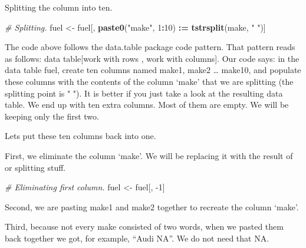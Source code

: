 \documentclass[]{book}
\newenvironment{Shaded}{\begin{snugshade}}{\end{snugshade}}
\newcommand{\CommentTok}[1]{\textcolor[rgb]{0.56,0.35,0.01}{\textit{#1}}}
\newcommand{\DecValTok}[1]{\textcolor[rgb]{0.00,0.00,0.81}{#1}}
\newcommand{\ErrorTok}[1]{\textcolor[rgb]{0.64,0.00,0.00}{\textbf{#1}}}
\newcommand{\KeywordTok}[1]{\textcolor[rgb]{0.13,0.29,0.53}{\textbf{#1}}}
\newcommand{\NormalTok}[1]{#1}
\newcommand{\OperatorTok}[1]{\textcolor[rgb]{0.81,0.36,0.00}{\textbf{#1}}}
\newcommand{\StringTok}[1]{\textcolor[rgb]{0.31,0.60,0.02}{#1}}
\begin{document}
Splitting the column into ten.

\begin{Shaded}
\begin{Highlighting}[]
\CommentTok{# Splitting.}
\NormalTok{fuel <-}\StringTok{ }\NormalTok{fuel[, }\KeywordTok{paste0}\NormalTok{(}\StringTok{"make"}\NormalTok{, }\DecValTok{1}\OperatorTok{:}\DecValTok{10}\NormalTok{) }\OperatorTok{:}\ErrorTok{=}\StringTok{ }\KeywordTok{tstrsplit}\NormalTok{(make, }\StringTok{" "}\NormalTok{)]}
\end{Highlighting}
\end{Shaded}

The code above follows the data.table package code pattern. That pattern reads as follows: data table{[}work with rows , work with columns{]}. Our code says: in the data table fuel, create ten columns named make1, make2 \ldots{} make10, and populate these columns with the contents of the column `make' that we are splitting (the splitting point is " "). It is better if you just take a look at the resulting data table. We end up with ten extra columns. Most of them are empty. We will be keeping only the first two.

Lets put these ten columns back into one.

First, we eliminate the column `make'. We will be replacing it with the result of or splitting stuff.

\begin{Shaded}
\begin{Highlighting}[]
\CommentTok{# Eliminating first column.}
\NormalTok{fuel <-}\StringTok{ }\NormalTok{fuel[, }\DecValTok{-1}\NormalTok{]}
\end{Highlighting}
\end{Shaded}

Second, we are pasting make1 and make2 together to recreate the column `make'.

\begin{Shaded}
\end{Shaded}

Third, because not every make consisted of two words, when we pasted them back together we got, for example, ``Audi NA''. We do not need that NA.

\begin{Shaded}
\end{Shaded}
\end{document}

